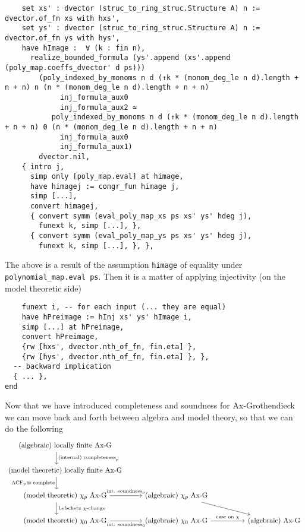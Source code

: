 \begin{lstlisting}
    set xs' : dvector (struc_to_ring_struc.Structure A) n := dvector.of_fn xs with hxs',
    set ys' : dvector (struc_to_ring_struc.Structure A) n := dvector.of_fn ys with hys',
    have hImage :  ∀ (k : fin n),
      realize_bounded_formula (ys'.append (xs'.append (poly_map.coeffs_dvector' d ps)))
        (poly_indexed_by_monoms n d (↑k * (monom_deg_le n d).length + n + n) n (n * (monom_deg_le n d).length + n + n)
             inj_formula_aux0
             inj_formula_aux2 ≃
           poly_indexed_by_monoms n d (↑k * (monom_deg_le n d).length + n + n) 0 (n * (monom_deg_le n d).length + n + n)
             inj_formula_aux0
             inj_formula_aux1)
        dvector.nil,
    { intro j,
      simp only [poly_map.eval] at himage,
      have himagej := congr_fun himage j,
      simp [...],
      convert himagej,
      { convert symm (eval_poly_map_xs ps xs' ys' hdeg j),
        funext k, simp [...], },
      { convert symm (eval_poly_map_ys ps xs' ys' hdeg j),
        funext k, simp [...], }, }, \end{lstlisting}

The above is a result of the assumption \texttt{himage} of equality
under \texttt{polynomial_map.eval ps}.
Then it is a matter of applying injectivity (on the model theoretic side)

\begin{lstlisting}
    funext i, -- for each input (... they are equal)
    have hPreimage := hInj xs' ys' hImage i,
    simp [...] at hPreimage,
    convert hPreimage,
    {rw [hxs', dvector.nth_of_fn, fin.eta] },
    {rw [hys', dvector.nth_of_fn, fin.eta] }, },
  -- backward implication
  { ... },
end \end{lstlisting}

Now that we have introduced completeness and soundness for
Ax-Grothendieck we can move back and forth between
algebra and model theory, so that we can do the following
\[\begin{tikzcd}
	{\text{(algebraic) locally finite Ax-G}} \\
	{\text{(model theoretic) locally finite Ax-G}} \\
	{\text{(model theoretic) }\chi_p \text{ Ax-G}} & {\text{(algebraic) }\chi_p \text{ Ax-G}} \\
	{\text{(model theoretic) }\chi_0 \text{ Ax-G}} & {\text{(algebraic) }\chi_0 \text{ Ax-G}} && {\text{(algebraic) Ax-G}}
	\arrow["{\ACF_{p} \text{is complete}}"', shift right=5, from=2-1, to=3-1]
	\arrow["{\text{(internal) completeness}_p}", shift right=5, from=1-1, to=2-1]
	\arrow["{\text{Lefschetz }\chi\text{-change}}", shift right=5, from=3-1, to=4-1]
	\arrow["{\text{int. soundness}_p}", from=3-1, to=3-2]
	\arrow["{\text{int. soundness}_0}"', from=4-1, to=4-2]
	\arrow[from=3-2, to=4-4]
	\arrow["{\text{case on }\chi}", from=4-2, to=4-4]
\end{tikzcd}\]

